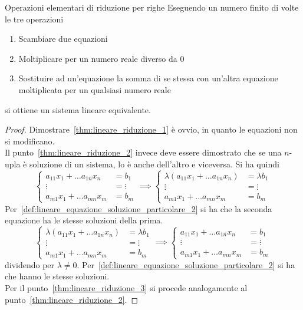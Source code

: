 \begin{Thm}{Operazioni elementari di riduzione per righe}
  Eseguendo un numero finito di volte le tre operazioni
  \begin{enumerate}
    \item\label{thm:lineare_riduzione_1} Scambiare due equazioni
    \item\label{thm:lineare_riduzione_2} Moltiplicare per un numero reale diverso da
      $0$
    \item\label{thm:lineare_riduzione_3} Sostituire ad un'equazione la somma di se
      stessa con un'altra equazione moltiplicata per un qualsiasi numero reale
  \end{enumerate}
  si ottiene un sistema lineare equivalente.
\end{Thm}

\begin{proof}
  Dimostrare~\ref{thm:lineare_riduzione_1} è ovvio, in quanto le equazioni non si
  modificano.\\
  Il punto~\ref{thm:lineare_riduzione_2} invece deve essere dimostrato che se una
  $n$-upla è soluzione di un sistema, lo è anche dell'altro e viceversa. Si ha quindi
  \begin{equation*}
    \begin{cases}
      a_{11}x_1+\ldots a_{1n}x_n &= b_1\\
      \vdots &= \vdots\\
      a_{m1}x_1+\ldots a_{mn}x_m &= b_m
    \end{cases} \implies
    \begin{cases}
      \lambda(a_{11}x_1+\ldots a_{1n}x_n) &= \lambda b_1\\
      \vdots &= \vdots\\
      a_{m1}x_1+\ldots a_{mn}x_m &= b_m
    \end{cases}
  \end{equation*}
  Per~\autoref{def:lineare_equazione_soluzione_particolare_2} si ha che la seconda
  equazione ha le stesse soluzioni della prima.
  \begin{equation*}
    \begin{cases}
      \lambda(a_{11}x_1+\ldots a_{1n}x_n) &= \lambda b_1\\
      \vdots &= \vdots\\
      a_{m1}x_1+\ldots a_{mn}x_m &= b_m
    \end{cases} \implies
    \begin{cases}
      a_{11}x_1+\ldots a_{1n}x_n &= b_1\\
      \vdots &= \vdots\\
      a_{m1}x_1+\ldots a_{mn}x_m &= b_m
    \end{cases}
  \end{equation*}
  dividendo per $\lambda\neq0$.
  Per~\autoref{def:lineare_equazione_soluzione_particolare_2} si ha che hanno le stesse
  soluzioni.\\
  Per il punto~\ref{thm:lineare_riduzione_3} si procede analogamente al
  punto~\ref{thm:lineare_riduzione_2}.
\end{proof}

